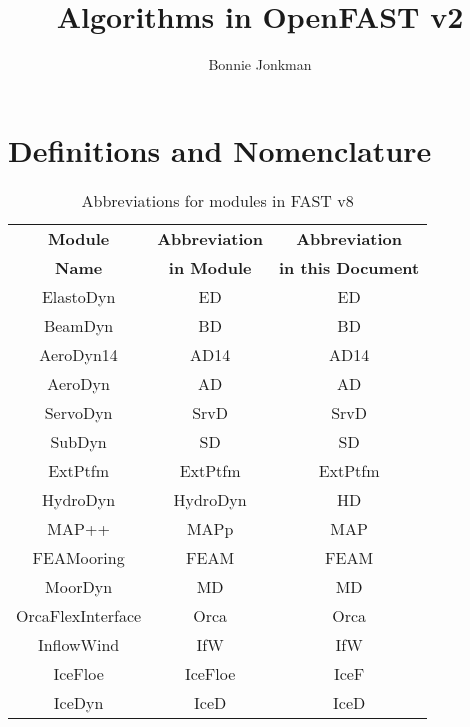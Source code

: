 \documentclass[10pt,letterpaper,oneside,notitlepage]{article}
\begin{document}
\title{Algorithms in OpenFAST v2}
\author{Bonnie Jonkman}
\maketitle


\section{Definitions and Nomenclature}


\begin{table}[h]
   \centering
      \begin{tabular}{c|c|c}
      \textbf{Module} & \textbf{Abbreviation} & \textbf{Abbreviation}\\
      \textbf{Name}   & \textbf{in Module}    & \textbf{in this Document}\\
      \hline 
      ElastoDyn          & ED                    & ED        \\
      BeamDyn            & BD                    & BD        \\
      AeroDyn14          & AD14                  & AD14      \\
      AeroDyn            & AD                    & AD        \\
      ServoDyn           & SrvD                  & SrvD      \\
      SubDyn             & SD                    & SD        \\
      ExtPtfm            & ExtPtfm               & ExtPtfm   \\
      HydroDyn           & HydroDyn              & HD        \\
      MAP++              & MAPp                  & MAP       \\
      FEAMooring         & FEAM                  & FEAM      \\
      MoorDyn            & MD                    & MD        \\
      OrcaFlexInterface  & Orca                  & Orca      \\
      InflowWind         & IfW                   & IfW       \\   
      IceFloe            & IceFloe               & IceF      \\   
      IceDyn             & IceD                  & IceD      \\   
      \end{tabular}
   \caption{Abbreviations for modules in FAST v8}
   \label{tab:Abbrev}
\end{table}
\end{document}

